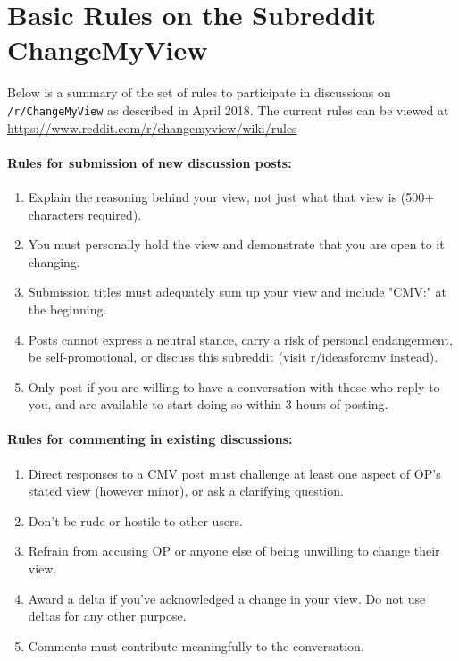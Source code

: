 

\section{Basic Rules on the Subreddit ChangeMyView}\label{app:rules}

Below is a summary of the set of rules to participate in discussions on \texttt{/r/ChangeMyView} as described in April 2018. The current rules can be viewed at \url{https://www.reddit.com/r/changemyview/wiki/rules}

\paragraph{Rules for submission of new discussion posts:}
\begin{enumerate}[A]\singlespacing
\item Explain the reasoning behind your view, not just what that view is (500+ characters required).
\item You must personally hold the view and demonstrate that you are open to it changing.
\item Submission titles must adequately sum up your view and include "CMV:" at the beginning.
\item Posts cannot express a neutral stance, carry a risk of personal endangerment, be self-promotional, or discuss this subreddit (visit r/ideasforcmv instead).
\item Only post if you are willing to have a conversation with those who reply to you, and are available to start doing so within 3 hours of posting.
\end{enumerate}

\paragraph{Rules for commenting in existing discussions:}
\begin{enumerate}[1]\singlespacing
\item Direct responses to a CMV post must challenge at least one aspect of OP’s stated view (however minor), or ask a clarifying question.
\item Don't be rude or hostile to other users.
\item Refrain from accusing OP or anyone else of being unwilling to change their view.
\item Award a delta if you've acknowledged a change in your view. Do not use deltas for any other purpose.
\item Comments must contribute meaningfully to the conversation.
\end{enumerate}


